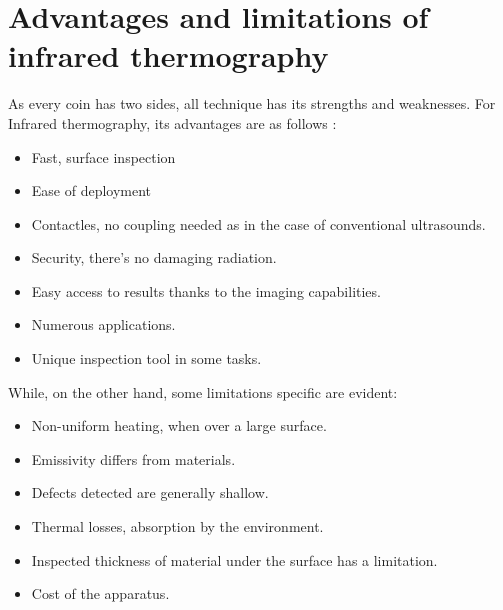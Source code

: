 \section{Advantages and limitations of infrared thermography}
As every coin has two sides, all technique has its strengths and weaknesses. For Infrared thermography, its advantages are as follows \citep{maldague3introduction, Maldague2001theory}:
\begin{itemize}
	\item Fast, surface inspection
	\item Ease of deployment
	\item Contactles, no coupling needed as in the case of conventional ultrasounds.
	\item Security, there's no damaging radiation.
	\item Easy access to results thanks to the imaging capabilities.
	\item Numerous applications.
	\item Unique inspection tool in some tasks.
\end{itemize}
While, on the other hand, some limitations specific are evident:%
\begin{itemize}
	\item Non-uniform heating, when over a large surface.
	\item Emissivity differs from materials.
	\item Defects detected are generally shallow.
	\item Thermal losses, absorption by the environment.
	\item Inspected thickness of material under the surface has a limitation.
	\item Cost of the apparatus.
\end{itemize}

